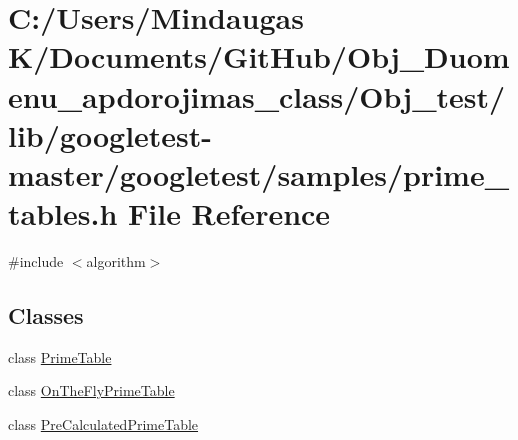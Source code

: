 \hypertarget{_obj__test_2lib_2googletest-master_2googletest_2samples_2prime__tables_8h}{}\section{C\+:/\+Users/\+Mindaugas K/\+Documents/\+Git\+Hub/\+Obj\+\_\+\+Duomenu\+\_\+apdorojimas\+\_\+class/\+Obj\+\_\+test/lib/googletest-\/master/googletest/samples/prime\+\_\+tables.h File Reference}
\label{_obj__test_2lib_2googletest-master_2googletest_2samples_2prime__tables_8h}
{\ttfamily \#include $<$algorithm$>$}\newline
\subsection*{Classes}
\begin{DoxyCompactItemize}
\item 
class \mbox{\hyperlink{class_prime_table}{Prime\+Table}}
\item 
class \mbox{\hyperlink{class_on_the_fly_prime_table}{On\+The\+Fly\+Prime\+Table}}
\item 
class \mbox{\hyperlink{class_pre_calculated_prime_table}{Pre\+Calculated\+Prime\+Table}}
\end{DoxyCompactItemize}
